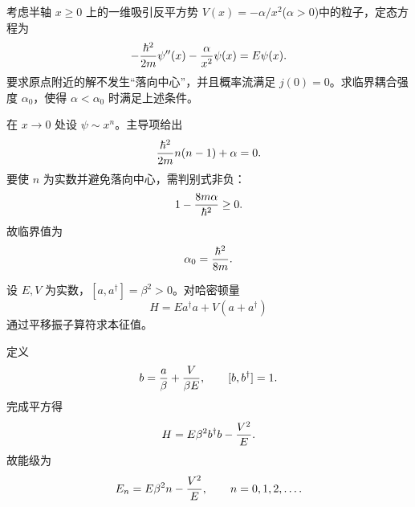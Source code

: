 \begin{question}
考虑半轴 $x\ge0$ 上的一维吸引反平方势 $V(x)=-\alpha/x^2$($\alpha>0$)中的粒子，定态方程为
\[
  -{\hbar^2\over2m}\psi''(x)-{\alpha\over x^2}\psi(x)=E\psi(x).
\]
要求原点附近的解不发生“落向中心”，并且概率流满足 $j(0)=0$。求临界耦合强度 $\alpha_0$，使得 $\alpha<\alpha_0$ 时满足上述条件。
\begin{solution}
在 $x\to0$ 处设 $\psi\sim x^n$。主导项给出
\[
  {\hbar^2\over2m}n(n-1)+\alpha=0.
\]
要使 $n$ 为实数并避免落向中心，需判别式非负：
\[
  1-{8m\alpha\over\hbar^2}\ge0.
\]
故临界值为
\[
  \alpha_0={\hbar^2\over8m}.
\]
\end{solution}
\end{question}

\begin{question}
设 $E,V$ 为实数，$[a,a^\dagger]=\beta^2>0$。对哈密顿量
\[
  H=E a^\dagger a+V(a+a^\dagger)
\]
通过平移振子算符求本征值。
\begin{solution}
定义
\[
  b={a\over\beta}+{V\over\beta E},
  \qquad [b,b^\dagger]=1.
\]
完成平方得
\[
  H=E\beta^2 b^\dagger b-{V^2\over E}.
\]
故能级为
\[
  E_n=E\beta^2 n-{V^2\over E},
  \qquad n=0,1,2,\ldots .
\]
\end{solution}
\end{question}
